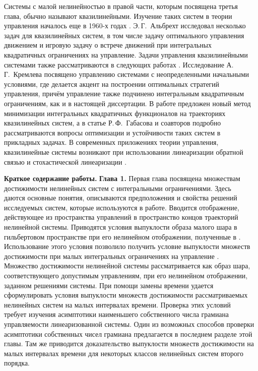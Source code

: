 \documentclass[../main.tex]{subfiles}
\begin{document}
Системы с малой нелинейностью в правой части, которым посвящена третья глава, обычно называют квазилинейными. 
Изучение таких систем в теории управления началось еще в 1960-х годах \cite{Kiselev, Kras_book, Subbotin1967}.
Э.\,Г.~Альбрехт исследовал несколько задач для квазилинейных систем, в том числе задачу оптимального управления движением \cite{Albrecht1} и игровую задачу о встрече движений \cite{Albrecht2} при интегральных квадратичных ограничениях на управление.
Задачи управления квазилинейными системами также рассматриваются в следующих работах \cite{Dauer, Kremlev, KalininLavrinovich2018, Gabasov}.
Исследование А.\,Г.~Кремлева \cite{Kremlev} посвящено управлению системами с неопределенными начальными условиями, где делается акцент на построении оптимальных стратегий управления, причём управление также подчинено интегральным квадратичным ограничениям, как и в настоящей диссертации.
В работе \cite{KalininLavrinovich2018} предложен новый метод минимизации интегральных квадратичных функционалов на траекториях квазилинейных систем, а в статье Р.\,Ф.~Габасова и соавторов \cite{Gabasov} подробно рассматриваются вопросы оптимизации и устойчивости таких систем в прикладных задачах.
В современных приложениях теории управления, квазилинейные системы возникают при использовании линеаризации обратной связью и стохастической линеаризации \cite{Ching, Gui}.



\textbf{Краткое содержание работы.} \textbf{Глава 1. } 
Первая глава посвящена множествам достижимости нелинейных систем с интегральными ограничениями. 
Здесь даются основные понятия, описываются предположения и свойства решений исследуемых систем, которые используются в работе. 
Вводится отображение, действующее из пространства управлений в пространство концов траекторий нелинейной системы. 
Приводятся условия выпуклости образа малого шара в гильбертовом пространстве при его нелинейном отображении, полученные в \cite{Polyak2001}. 
Использование этого условия позволило получить условие выпуклости множеств достижимости при малых интегральных ограничениях на управление \cite{Polyak2004}.
Множество достижимости нелинейной системы рассматривается как образ шара, соответствующего допустимым управлениям, при его нелинейном отображении, заданном решениями системы.
При помощи замены времени удается сформулировать условия выпуклости множеств достижимости рассматриваемых нелинейных систем на малых интервалах времени. 
Проверка этих условий требует изучения асимптотики наименьшего собственного числа грамиана управляемости линеаризованной системы.
Один из возможных способов проверки асимптотики собственных чисел грамиана предлагается в последнем разделе этой главы. 
Там же приводится доказательство выпуклости множеств достижимости на малых интервалах времени для некоторых классов нелинейных систем второго порядка. 
\end{document}
